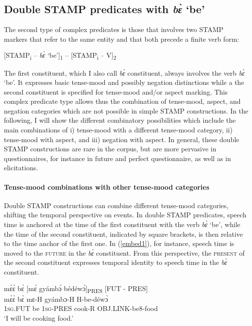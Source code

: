 \subsection{Double STAMP predicates with {\itshape bɛ̀} `be'}
\label {sec:Compbe}

The second type of complex predicates is those that involves two STAMP markers that refer to the same entity and that both precede a finite verb form: 
\begin{center}[STAMP\textsubscript{i} -- {\itshape bɛ̀} `be']\textsubscript{1} -- [STAMP\textsubscript{i} -- V]\textsubscript{2}
\end{center}
 
\noindent The first constituent, which I also call {\itshape bɛ̀} constituent, always involves the verb {\itshape bɛ̀} `be'. It expresses basic tense-mood and possibly negation distinctions while a the second constituent is specified for tense-mood and/or aspect marking. This complex predicate type allows thus the combination of tense-mood, aspect, and negation categories which are not possible in simple STAMP constructions. In the following, I will show the different combinatory possibilities which include the main combinations of i) tense-mood with a different tense-mood category, ii) tense-mood with aspect, and iii) negation with aspect. In general, these double STAMP constructions are rare in the corpus, but are more pervasive in questionnaires, for instance in  future and perfect questionnaire, as well as in elicitations.

\paragraph{Tense-mood combinations with other tense-mood categories}
Double STAMP constructions can combine different tense-mood categories, shifting the temporal perspective on events. In double STAMP predicates, speech time is anchored at the time of the first constituent with the verb {\itshape bɛ̀} `be', while the time of the  second constituent, indicated by square brackets, is then relative to the time anchor of the first one. In (\ref{embed1}), for instance, speech time is moved to the \textsc{future} in the {\itshape bɛ̀} constituent. From this perspective, the \textsc{present} of the second constituent expresses temporal identity to speech time in the {\itshape bɛ̀} constituent.

\begin{exe} 
\ex\label{embed1}
  \glll mɛ̀ɛ̀ bɛ̀ [mɛ́ gyámbɔ́ bédéwɔ̀]\textsubscript{PRES} \hfill [FUT - PRES]\\
        mɛ̀ɛ̀ bɛ̀ mɛ-H gyámbɔ-H H-be-déwɔ̀ \\
        1\textsc{sg}.FUT be 1\textsc{sg}-PRES cook-R OBJ.LINK-be8-food \\
    \trans `I will be cooking food.'
\end{exe}


